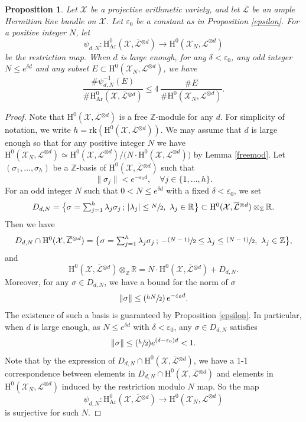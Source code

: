 \documentclass[11pt]{article}
\numberwithin{equation}{section}
\newcommand{\Psfrac}[2]{(\sfrac{#1}{#2})}
\newcommand{\psfrac}[2]{\sfrac{(#1)}{#2}}
\newcommand{\sep}{\,;\,}
\theoremstyle{plain}
\newtheorem{prop}[thm]{Proposition}
\theoremstyle{definition}
\newcommand{\ho}{\mathrm{H}}
\newcommand{\X}{\mathcal{X}}
\newcommand{\Li}{\overline{\mathcal{L}}{}}
\newcommand{\li}{\mathcal{L}}
\newcommand{\Z}{\mathbb{Z}}
\begin{document}
\begin{prop}\label{ed}
Let $\X$ be a projective arithmetic variety, and let $\Li$ be an ample Hermitian line bundle on $\X$. Let $\varepsilon_0$ be a constant as in Proposition \ref{epsilon}. For a positive integer $N$, let
\[
\psi_{d,N}: \ho^0_{\mathrm{Ar}}(\X,\Li^{\otimes d}) \to \ho^0(\X_{N},\li^{\otimes d})
\]
be the restriction map. When $d$ is large enough, for any $\delta<\varepsilon_0$, any odd integer $N\leq e^{\delta d}$ and any subset $E\subset \ho^0(\X_{N},\li^{\otimes d}) $,
we have
\[
\frac{\#\psi_{d,N}^{-1}(E)}{\# \ho^0_{\mathrm{Ar}}(\X,\Li^{\otimes d})}\leq 4\, \frac{\#E}{\#\ho^0(\X_{N},\li^{\otimes d})}.
\]
\end{prop}
\begin{proof}[Proof]
Note that $\ho^0(\X,\Li^{\otimes d})$ is a free $\Z$-module for any $d$. For simplicity of notation, we write $h=\mathrm{rk}(\ho^0(\X,\Li^{\otimes d}))$. We may assume that $d$ is large enough so that for any positive integer $N$ we have $\ho^0(\X_N,\li^{\otimes d})\simeq\ho^0(\X,\li^{\otimes d})/\big(N\cdot \ho^0(\X,\li^{\otimes d})\big)$ by Lemma \ref{freemod}. Let $(\sigma_1,\dots, \sigma_h)$ be a $\Z$-basis of $\ho^0(\X,\Li^{\otimes d})$ such that
\[
\lVert \sigma_j\rVert <e^{-\varepsilon_0 d}, \quad \forall j\in \{ 1,\dots, h \}.
\]
For an odd integer $N$ such that $0<N\leq e^{\delta d}$ with a fixed $\delta<\varepsilon_0$, we set
\[\textstyle
D_{d,N}=\bigl\{ \sigma=\sum_{j=1}^{h}\lambda_j \sigma_j\sep |\lambda_j|\leq \sfrac{N}{2},\ \lambda_j\in \mathbb{R} \bigr\}\subset \ho^0(\X,\Li^{\otimes d})\otimes_{ \mathbb{Z}}\mathbb{R}.
\]
Then we have
\[\textstyle
D_{d,N}\cap \ho^0(\X,\Li^{\otimes d})=
\bigl\{ \sigma=\sum_{j=1}^{h}\lambda_j \sigma_j\sep -\psfrac{N-1}{2}\leq \lambda_j\leq \psfrac{N-1}{2},\ \lambda_j\in \mathbb{Z} \bigr\},
\]
and
\[
\ho^0(\X,\Li^{\otimes d})\otimes_{ \mathbb{Z}}\mathbb{R}=N\cdot \ho^0(\X,\Li^{\otimes d}) +D_{d, N}.
\]
Moreover, for any $\sigma \in D_{d,N}$, we have a bound for the norm of $\sigma$
\[
\lVert \sigma\rVert \leq \Psfrac{hN}{2}\,e^{-\varepsilon_0 d}.
\]
The existence of such a basis is guaranteed by Proposition \ref{epsilon}. In particular, when $d$ is large enough, as $N\leq e^{\delta d}$ with $\delta <\varepsilon_0$, any $\sigma \in D_{d,N}$ satisfies
\[
\lVert \sigma\rVert \leq \Psfrac{h}{2} e^{(\delta-\varepsilon_0) d}<1.
\]
Note that by the expression of $D_{d,N}\cap \ho^0(\X,\Li^{\otimes d})$, we have a 1-1 correspondence between elements in $D_{d,N}\cap \ho^0(\X,\Li^{\otimes d}) $ and elements in $\ho^0(\X_N, \li^{\otimes d})$ induced by the restriction modulo $N$ map. So the map
\[
\psi_{d,N}: \ho^0_{\mathrm{Ar}}(\X, \Li^{\otimes d}) \to \ho^0(\X_N, \li^{\otimes d})
\]
is surjective for such $N$.


\end{proof}
\end{document}
